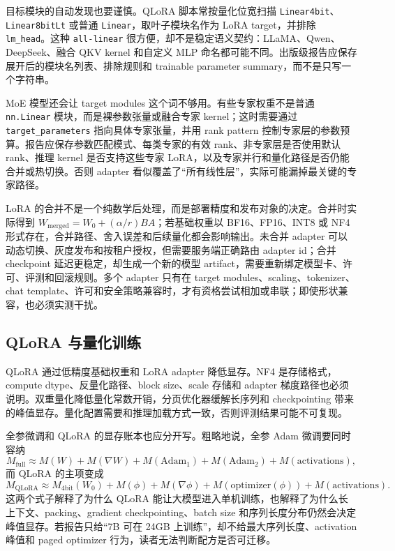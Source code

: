 \documentclass[UTF8,zihao=-4,openany]{ctexbook}
\begin{document}
目标模块的自动发现也要谨慎。QLoRA 脚本常按量化位宽扫描 \texttt{Linear4bit}、\texttt{Linear8bitLt} 或普通 \texttt{Linear}，取叶子模块名作为 LoRA target，并排除 \texttt{lm\_head}。这种 \texttt{all-linear} 很方便，却不是稳定语义契约：LLaMA、Qwen、DeepSeek、融合 QKV kernel 和自定义 MLP 命名都可能不同。出版级报告应保存展开后的模块名列表、排除规则和 trainable parameter summary，而不是只写一个字符串。

MoE 模型还会让 target modules 这个词不够用。有些专家权重不是普通 \texttt{nn.Linear} 模块，而是裸参数张量或融合专家 kernel；这时需要通过 \texttt{target\_parameters} 指向具体专家张量，并用 rank pattern 控制专家层的参数预算。报告应保存参数匹配模式、每类专家的有效 rank、非专家层是否使用默认 rank、推理 kernel 是否支持这些专家 LoRA，以及专家并行和量化路径是否仍能合并或热切换。否则 adapter 看似覆盖了“所有线性层”，实际可能漏掉最关键的专家路径。

LoRA 的合并不是一个纯数学后处理，而是部署精度和发布对象的决定。合并时实际得到 $W_{\mathrm{merged}}=W_0+(\alpha/r)BA$；若基础权重以 BF16、FP16、INT8 或 NF4 形式存在，合并路径、舍入误差和后续量化都会影响输出。未合并 adapter 可以动态切换、灰度发布和按租户授权，但需要服务端正确路由 adapter id；合并 checkpoint 延迟更稳定，却生成一个新的模型 artifact，需要重新绑定模型卡、许可、评测和回滚规则。多个 adapter 只有在 target modules、scaling、tokenizer、chat template、许可和安全策略兼容时，才有资格尝试相加或串联；即使形状兼容，也必须实测干扰。

\subsection{QLoRA 与量化训练}
QLoRA 通过低精度基础权重和 LoRA adapter 降低显存。NF4 是存储格式，compute dtype、反量化路径、block size、scale 存储和 adapter 梯度路径也必须说明。双重量化降低量化常数开销，分页优化器缓解长序列和 checkpointing 带来的峰值显存。量化配置需要和推理加载方式一致，否则评测结果可能不可复现。

全参微调和 QLoRA 的显存账本也应分开写。粗略地说，全参 Adam 微调要同时容纳
\[
  M_{\mathrm{full}}\approx M(W)+M(\nabla W)+M(\mathrm{Adam}_1)+M(\mathrm{Adam}_2)+M(\mathrm{activations}),
\]
而 QLoRA 的主项变成
\[
  M_{\mathrm{QLoRA}}\approx M_{\mathrm{4bit}}(W_0)+M(\phi)+M(\nabla\phi)+M(\mathrm{optimizer}(\phi))+M(\mathrm{activations}).
\]
这两个式子解释了为什么 QLoRA 能让大模型进入单机训练，也解释了为什么长上下文、packing、gradient checkpointing、batch size 和序列长度分布仍然会决定峰值显存。若报告只给“7B 可在 24GB 上训练”，却不给最大序列长度、activation 峰值和 paged optimizer 行为，读者无法判断配方是否可迁移。
\end{document}
